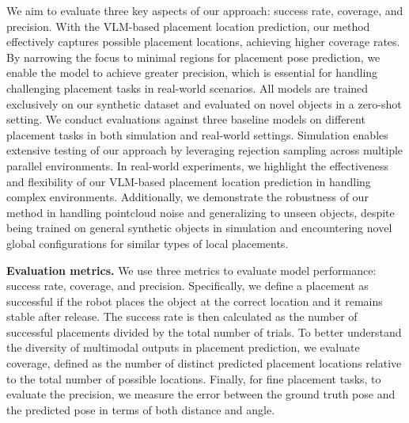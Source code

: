 We aim to evaluate three key aspects of our approach: success rate, coverage, and precision. With the VLM-based placement location prediction, our method effectively captures possible placement locations, achieving higher coverage rates. By narrowing the focus to minimal regions for placement pose prediction, we enable the model to achieve greater precision, which is essential for handling challenging placement tasks in real-world scenarios. All models are trained exclusively on our synthetic dataset and evaluated on novel objects in a zero-shot setting. We conduct evaluations against three baseline models on different placement tasks in both simulation and real-world settings. Simulation enables extensive testing of our approach by leveraging rejection sampling across multiple parallel environments. In real-world experiments, we highlight the effectiveness and flexibility of our VLM-based placement location prediction in handling complex environments. Additionally, we demonstrate the robustness of our method in handling pointcloud noise and generalizing to unseen objects, despite being trained on general synthetic objects in simulation and encountering novel global configurations for similar types of local placements.



\noindent \textbf{Evaluation metrics.}
We use three metrics to evaluate model performance: success rate, coverage, and precision. Specifically, we define a placement as successful if the robot places the object at the correct location and it remains stable after release. The success rate is then calculated as the number of successful placements divided by the total number of trials. To better understand the diversity of multimodal outputs in placement prediction, we evaluate coverage, defined as the number of distinct predicted placement locations relative to the total number of possible locations. Finally, for fine placement tasks, to evaluate the precision, we measure the error between the ground truth pose and the predicted pose in terms of both distance and angle.



